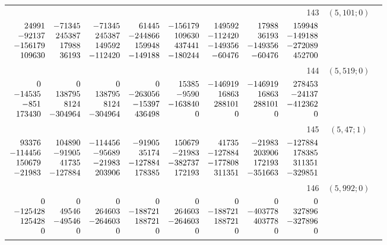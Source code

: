 \documentclass[11pt]{article}
\theoremstyle{remark}
\numberwithin{equation}{section}
\begin{document}
\begin{longtable}{rcl}
143 & $(5,101;0)$ & \begin{tabular}[t]{@{}l@{}}$w_i=\displaystyle \frac{723189644764078673}{2229602389369243966720000000000000000}$\\[3pt]{\scriptsize$\begin{array}{@{}rrrrrrrr@{}}24991 & -71345 & -71345 & 61445 & -156179 & 149592 & 17988 & 159948\\-92137 & 245387 & 245387 & -244866 & 109630 & -112420 & 36193 & -149188\\-156179 & 17988 & 149592 & 159948 & 437441 & -149356 & -149356 & -272089\\109630 & 36193 & -112420 & -149188 & -180244 & -60476 & -60476 & 452700\end{array}$}\end{tabular}\\[8pt]
144 & $(5,519;0)$ & \begin{tabular}[t]{@{}l@{}}$w_i=\displaystyle \frac{2555709449439763}{30333438191365922800000000000000000}$\\[3pt]{\scriptsize$\begin{array}{@{}rrrrrrrr@{}}0 & 0 & 0 & 0 & 15385 & -146919 & -146919 & 278453\\-14535 & 138795 & 138795 & -263056 & -9590 & 16863 & 16863 & -24137\\-851 & 8124 & 8124 & -15397 & -163840 & 288101 & 288101 & -412362\\173430 & -304964 & -304964 & 436498 & 0 & 0 & 0 & 0\end{array}$}\end{tabular}\\[8pt]
145 & $(5,47;1)$ & \begin{tabular}[t]{@{}l@{}}$w_i=\displaystyle \frac{11588690942183502527}{6227729362993572343920000000000000000}$\\[3pt]{\scriptsize$\begin{array}{@{}rrrrrrrr@{}}93376 & 104890 & -114456 & -91905 & 150679 & 41735 & -21983 & -127884\\-114456 & -91905 & -95689 & 35174 & -21983 & -127884 & 203906 & 178385\\150679 & 41735 & -21983 & -127884 & -382737 & -177808 & 172193 & 311351\\-21983 & -127884 & 203906 & 178385 & 172193 & 311351 & -351663 & -329851\end{array}$}\end{tabular}\\[8pt]
146 & $(5,992;0)$ & \begin{tabular}[t]{@{}l@{}}$w_i=\displaystyle \frac{200358596968816273}{553075252157223591936000000000000000}$\\[3pt]{\scriptsize$\begin{array}{@{}rrrrrrrr@{}}0 & 0 & 0 & 0 & 0 & 0 & 0 & 0\\-125428 & 49546 & 264603 & -188721 & 264603 & -188721 & -403778 & 327896\\125428 & -49546 & -264603 & 188721 & -264603 & 188721 & 403778 & -327896\\0 & 0 & 0 & 0 & 0 & 0 & 0 & 0\end{array}$}\end{tabular}\\[8pt]

\end{longtable}
\end{document}
